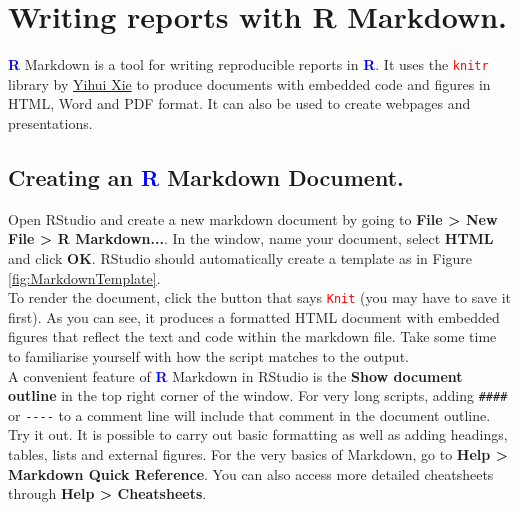 \documentclass[a4paper,12pt]{article}
\newcommand\boldblue[1]{\textcolor{blue}{\textbf{#1}}}
\newcommand\code[1]{\textcolor{red}{\texttt{#1}}}
\begin{document}
\section {Writing reports with R Markdown.}


\boldblue{R} Markdown is a tool for writing reproducible reports in \boldblue{R}. It uses the \code{knitr} library by \href{https://yihui.name/knitr/}{Yihui Xie} to produce documents with embedded code and figures in HTML, Word and PDF format. It can also be used to create webpages and presentations. 

\subsection{Creating an \boldblue{R} Markdown Document.}

Open RStudio and create a new markdown document by going to \textbf{File > New File > R Markdown...}. In the window, name your document, select \textbf{HTML} and click \textbf{OK}. RStudio should automatically create a template as in Figure \ref{fig:MarkdownTemplate}. \\

To render the document, click the button that says \code{Knit} (you may have to save it first). As you can see, it produces a formatted HTML document with embedded figures that reflect the text and code within the markdown file. Take some time to familiarise yourself with how the script matches to the output. \\

A convenient feature of \boldblue{R} Markdown in RStudio is the \textbf{Show document outline} in the top right corner of the window. For very long scripts, adding \verb!####! or \verb!----! to a comment line will include that comment in the document outline. Try it out. It is possible to carry out basic formatting as well as adding headings, tables, lists and external figures. For the very basics of Markdown, go to \textbf{Help > Markdown Quick Reference}. You can also access more detailed cheatsheets through \textbf{Help > Cheatsheets}.\\
\end{document}
